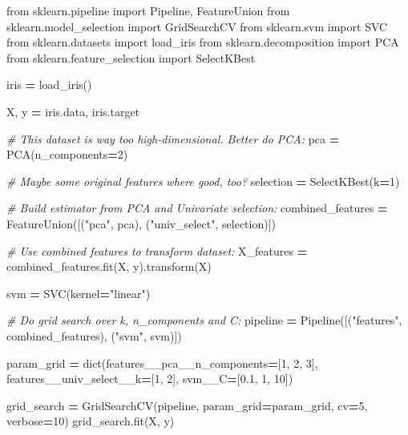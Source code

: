 \documentclass[]{scrbook}
\newenvironment{Shaded}{\begin{snugshade}}{\end{snugshade}}
\newcommand{\BuiltInTok}[1]{#1}
\newcommand{\CommentTok}[1]{\textcolor[rgb]{0.56,0.35,0.01}{\textit{#1}}}
\newcommand{\DecValTok}[1]{\textcolor[rgb]{0.00,0.00,0.81}{#1}}
\newcommand{\FloatTok}[1]{\textcolor[rgb]{0.00,0.00,0.81}{#1}}
\newcommand{\ImportTok}[1]{#1}
\newcommand{\NormalTok}[1]{#1}
\newcommand{\OperatorTok}[1]{\textcolor[rgb]{0.81,0.36,0.00}{\textbf{#1}}}
\newcommand{\StringTok}[1]{\textcolor[rgb]{0.31,0.60,0.02}{#1}}
\renewenvironment{Shaded} {\begin{snugshade}\small} {\end{snugshade}}
\begin{document}
\begin{Shaded}
\begin{Highlighting}[]
\ImportTok{from}\NormalTok{ sklearn.pipeline }\ImportTok{import}\NormalTok{ Pipeline, FeatureUnion}
\ImportTok{from}\NormalTok{ sklearn.model_selection }\ImportTok{import}\NormalTok{ GridSearchCV}
\ImportTok{from}\NormalTok{ sklearn.svm }\ImportTok{import}\NormalTok{ SVC}
\ImportTok{from}\NormalTok{ sklearn.datasets }\ImportTok{import}\NormalTok{ load_iris}
\ImportTok{from}\NormalTok{ sklearn.decomposition }\ImportTok{import}\NormalTok{ PCA}
\ImportTok{from}\NormalTok{ sklearn.feature_selection }\ImportTok{import}\NormalTok{ SelectKBest}

\NormalTok{iris }\OperatorTok{=}\NormalTok{ load_iris()}

\NormalTok{X, y }\OperatorTok{=}\NormalTok{ iris.data, iris.target}

\CommentTok{# This dataset is way too high-dimensional. Better do PCA:}
\NormalTok{pca }\OperatorTok{=}\NormalTok{ PCA(n_components}\OperatorTok{=}\DecValTok{2}\NormalTok{)}

\CommentTok{# Maybe some original features where good, too?}
\NormalTok{selection }\OperatorTok{=}\NormalTok{ SelectKBest(k}\OperatorTok{=}\DecValTok{1}\NormalTok{)}

\CommentTok{# Build estimator from PCA and Univariate selection:}
\NormalTok{combined_features }\OperatorTok{=}\NormalTok{ FeatureUnion([(}\StringTok{"pca"}\NormalTok{, pca), (}\StringTok{"univ_select"}\NormalTok{, selection)])}

\CommentTok{# Use combined features to transform dataset:}
\NormalTok{X_features }\OperatorTok{=}\NormalTok{ combined_features.fit(X, y).transform(X)}

\NormalTok{svm }\OperatorTok{=}\NormalTok{ SVC(kernel}\OperatorTok{=}\StringTok{"linear"}\NormalTok{)}

\CommentTok{# Do grid search over k, n_components and C:}
\NormalTok{pipeline }\OperatorTok{=}\NormalTok{ Pipeline([(}\StringTok{"features"}\NormalTok{, combined_features), (}\StringTok{"svm"}\NormalTok{, svm)])}

\NormalTok{param_grid }\OperatorTok{=} \BuiltInTok{dict}\NormalTok{(features__pca__n_components}\OperatorTok{=}\NormalTok{[}\DecValTok{1}\NormalTok{, }\DecValTok{2}\NormalTok{, }\DecValTok{3}\NormalTok{],}
\NormalTok{                  features__univ_select__k}\OperatorTok{=}\NormalTok{[}\DecValTok{1}\NormalTok{, }\DecValTok{2}\NormalTok{],}
\NormalTok{                  svm__C}\OperatorTok{=}\NormalTok{[}\FloatTok{0.1}\NormalTok{, }\DecValTok{1}\NormalTok{, }\DecValTok{10}\NormalTok{])}

\NormalTok{grid_search }\OperatorTok{=}\NormalTok{ GridSearchCV(pipeline, param_grid}\OperatorTok{=}\NormalTok{param_grid, cv}\OperatorTok{=}\DecValTok{5}\NormalTok{, verbose}\OperatorTok{=}\DecValTok{10}\NormalTok{)}
\NormalTok{grid_search.fit(X, y)}
\end{Highlighting}
\end{Shaded}
\end{document}
